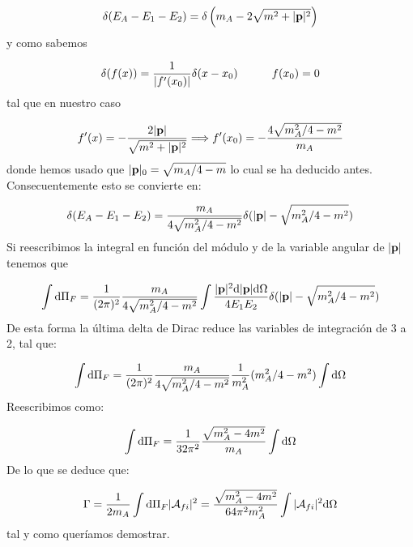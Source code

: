 \begin{solucion}
	\begin{equation*}
		\delta (E_A - E_1 - E_2) = \delta \left( m_A -2\sqrt{m^2 + |\mathbf{p}|^2 } \right)
	\end{equation*}
	y como sabemos 
	
	\begin{equation*}
		\delta (f(x)) = \frac{1}{|f'(x_0)|} \delta (x-x_0) \quad \quad \quad f(x_0)=0
	\end{equation*}
	tal que en nuestro caso
	
	\begin{equation*}
		f'(x) = -\frac{2|\mathbf{p}|}{\sqrt{m^2+|\mathbf{p}|^2}} \Longrightarrow f'(x_0) =- \frac{4\sqrt{m_A^2/4-m^2}}{m_A}
	\end{equation*}
	donde hemos usado que $	|\mathbf{p}|_0 = \sqrt{m_A/4-m}$ lo cual se ha deducido antes. Consecuentemente esto se convierte en:
	
	\begin{equation*}
		\delta (E_A - E_1 - E_2) = \frac{m_A}{4\sqrt{m_A^2/4-m^2}} \delta(|\mathbf{p}|- \sqrt{m_A^2/4-m^2})
	\end{equation*}
	Si reescribimos la integral en función del módulo y de la variable angular de $|\mathbf{p}|$ tenemos que
	
	\begin{equation*}
		\int \mathrm{d} \Pi_F = \frac{1}{(2\pi)^2}\frac{m_A}{4\sqrt{m_A^2/4-m^2}} \int  \frac{|\mathbf{p}|^2 \mathrm{d} |\mathbf{p}| \mathrm{d} \Omega}{4E_1E_2}  \delta(|\mathbf{p}|- \sqrt{m_A^2/4-m^2})
	\end{equation*}
	De esta forma la última delta de Dirac reduce las variables de integración de 3 a 2, tal que:
	
	\begin{equation*}
		\int \mathrm{d} \Pi_F = \frac{1}{(2\pi)^2}\frac{m_A}{4\sqrt{m_A^2/4-m^2}} \frac{1}{m_A^2}  
		(m_A^2/4 - m^2)	\int \mathrm{d} \Omega
	\end{equation*}
	Reescribimos como:
	
	\begin{equation*}
		\int \mathrm{d} \Pi_F = \frac{1}{32 \pi^2 } \frac{\sqrt{m_A^2-4m^2}}{m_A} \int \mathrm{d} \Omega
	\end{equation*}
	De lo que se deduce que:
	
	\begin{equation*}
		\Gamma = \frac{1}{2m_A} \int \mathrm{d} \Pi_F |\mathcal{A}_{fi}|^2 = \frac{\sqrt{m_A^2-4m^2}}{64\pi^2 m_A^2} \int |\mathcal{A}_{fi}|^2 \mathrm{d} \Omega
	\end{equation*}
	tal y como queríamos demostrar.
\end{solucion}


